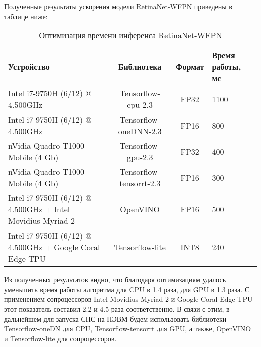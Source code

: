 Полученные результаты ускорения модели RetinaNet-WFPN приведены в таблице ниже:

\begin{table}[H]
    \caption{Оптимизация времени инференса RetinaNet-WFPN}\label{leaderboard-optilization}
    \begin{tabular}{|p{6cm}|c|c|p{2cm}|}
        \hline
        {Устройство} & {Библиотека} & {Формат} & {Время работы, мс} \\
        \hline
        Intel i7-9750H (6/12) @ 4.500GHz & Tensorflow-cpu-2.3 & FP32 & 1100 \\
        \hline
        Intel i7-9750H (6/12) @ 4.500GHz & Tensorflow-oneDNN-2.3 & FP16 & 800 \\
        \hline
        nVidia Quadro T1000 Mobile (4 Gb) & Tensorflow-gpu-2.3 & FP32 & 400 \\
        \hline
        nVidia Quadro T1000 Mobile (4 Gb) & Tensorflow-tensorrt-2.3 & FP16 & 300 \\
        \hline
        Intel i7-9750H (6/12) @ 4.500GHz + Intel Movidius Myriad 2 & OpenVINO & FP16 & 500 \\
        \hline
        Intel i7-9750H (6/12) @ 4.500GHz + Google Coral Edge TPU & Tensorflow-lite & INT8 & 240 \\
        \hline
    \end{tabular}
\end{table}

Из полученных результатов видно, что благодаря оптимизациям удалось уменьшить время работы алгоритма для CPU в 1.4 раза, для GPU в 1.3 раза. С применением сопроцессоров Intel Movidius Myriad 2 и Google Coral Edge TPU этот показатель составил 2.2 и 4.5 раза соответственно. В связи с этим, в дальнейшем для запуска СНС на ПЭВМ будем использовать библиотеки Tensorflow-oneDN для CPU, Tensorflow-tensorrt для GPU, а также, OpenVINO и Tensorflow-lite для сопроцессоров.

